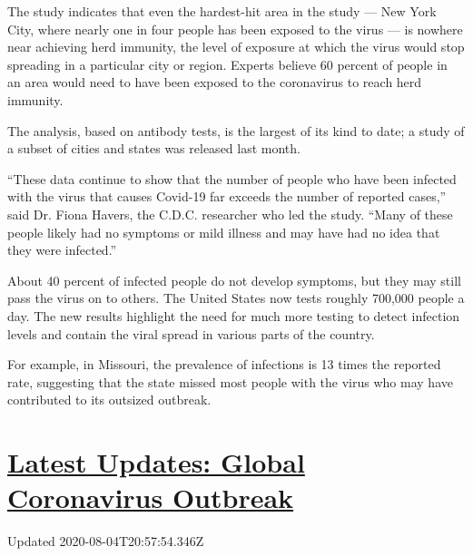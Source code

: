 The study indicates that even the hardest-hit area in the study --- New
York City, where nearly one in four people has been exposed to the virus
--- is nowhere near achieving herd immunity, the level of exposure at
which the virus would stop spreading in a particular city or region.
Experts believe 60 percent of people in an area would need to have been
exposed to the coronavirus to reach herd immunity.

The analysis, based on antibody tests, is the largest of its kind to
date; a study of a subset of cities and states was released last month.

``These data continue to show that the number of people who have been
infected with the virus that causes Covid-19 far exceeds the number of
reported cases,'' said Dr. Fiona Havers, the C.D.C. researcher who led
the study. ``Many of these people likely had no symptoms or mild illness
and may have had no idea that they were infected.''

About 40 percent of infected people do not develop symptoms, but they
may still pass the virus on to others. The United States now tests
roughly 700,000 people a day. The new results highlight the need for
much more testing to detect infection levels and contain the viral
spread in various parts of the country.

For example, in Missouri, the prevalence of infections is 13 times the
reported rate, suggesting that the state missed most people with the
virus who may have contributed to its outsized outbreak.

\hypertarget{latest-updates-global-coronavirus-outbreak}{%
\section{\texorpdfstring{\href{https://www.nytimes.com/2020/08/04/world/coronavirus-cases.html?action=click\&pgtype=Article\&state=default\&region=MAIN_CONTENT_1\&context=storylines_live_updates}{Latest
Updates: Global Coronavirus
Outbreak}}{Latest Updates: Global Coronavirus Outbreak}}\label{latest-updates-global-coronavirus-outbreak}}

Updated 2020-08-04T20:57:54.346Z

